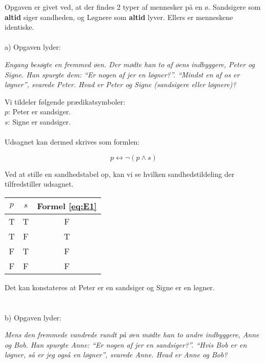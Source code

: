 Opgaven er givet ved, at der findes 2 typer af mennesker på en ø. Sandsigere som \textbf{altid} siger sandheden, og Løgnere som \textbf{altid} lyver. Ellers er menneskene identiske.\\
\\
a) Opgaven lyder:

\begin{center}
\textit{Engang besøgte en fremmed øen. Der mødte han to af øens indbyggere, Peter og Signe. Han spurgte dem: “Er nogen af jer en løgner?”. “Mindst en af os er løgner”, svarede Peter. Hvad er Peter og Signe (sandsigere eller løgnere)?}
\end{center}

Vi tildeler følgende prædikatsymboler:\\
$p$: Peter er sandsiger.\\ $s$: Signe er sandsiger.\\
\\
Udsagnet kan dermed skrives som formlen: 

\begin{equation}
p \leftrightarrow \neg (p \wedge s)
\label{eq:E1}
\end{equation}

Ved at stille en sandhedstabel op, kan vi se hvilken sandhedstildeling der tilfredstiller udsagnet.

\begin{table}[H]
\centering
\begin{tabular}{c|c|c}
$p$ & $s$ & Formel \eqref{eq:E1} \\ \hline
T & T & F  \\
T & F & T  \\
F & T & F  \\
F & F & F 
\end{tabular}
\end{table}

Det kan konstateres at Peter er en sandsiger og Signe er en løgner.\\
\\
\\

b) Opgaven lyder: 

\begin{center}
\textit{Mens den fremmede vandrede rundt på øen mødte han to andre indbyggere, Anne og Bob. Han spurgte Anne: “Er nogen af jer en sandsiger?”. “Hvis Bob er en løgner, så er jeg også en løgner”, svarede Anne. Hvad er Anne og Bob?}
\end{center}


